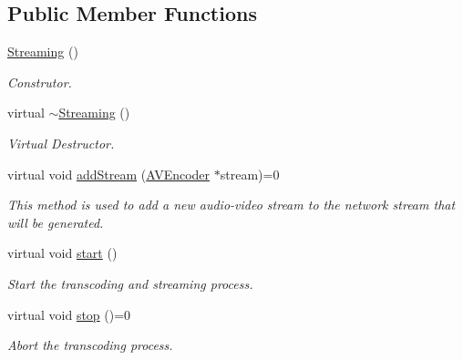\subsection*{Public Member Functions}
\begin{DoxyCompactItemize}
\item 
\hyperlink{classbr_1_1ufscar_1_1lince_1_1xpta_1_1streaming_1_1Streaming_aa7a5e595f809abdd9eee1d76c5f83d9a}{Streaming} ()
\begin{DoxyCompactList}\small\item\em Construtor. \item\end{DoxyCompactList}\item 
virtual \hyperlink{classbr_1_1ufscar_1_1lince_1_1xpta_1_1streaming_1_1Streaming_a9813a24dd86dd3a4424f39d139563170}{$\sim$Streaming} ()
\begin{DoxyCompactList}\small\item\em Virtual Destructor. \item\end{DoxyCompactList}\item 
virtual void \hyperlink{classbr_1_1ufscar_1_1lince_1_1xpta_1_1streaming_1_1Streaming_aec5910b2e3d8c442c16b08ee4717cad5}{addStream} (\hyperlink{classbr_1_1ufscar_1_1lince_1_1xpta_1_1streaming_1_1AVEncoder}{AVEncoder} $\ast$stream)=0
\begin{DoxyCompactList}\small\item\em This method is used to add a new audio-\/video stream to the network stream that will be generated. \item\end{DoxyCompactList}\item 
virtual void \hyperlink{classbr_1_1ufscar_1_1lince_1_1xpta_1_1streaming_1_1Streaming_ae8498ac9f6d5efce8eda3fcfaebe2d5f}{start} ()
\begin{DoxyCompactList}\small\item\em Start the transcoding and streaming process. \item\end{DoxyCompactList}\item 
virtual void \hyperlink{classbr_1_1ufscar_1_1lince_1_1xpta_1_1streaming_1_1Streaming_a2d1975eb985a2854d4d6f4c36c002910}{stop} ()=0
\begin{DoxyCompactList}\small\item\em Abort the transcoding process. \item\end{DoxyCompactList}\item 

\end{DoxyCompactItemize}

